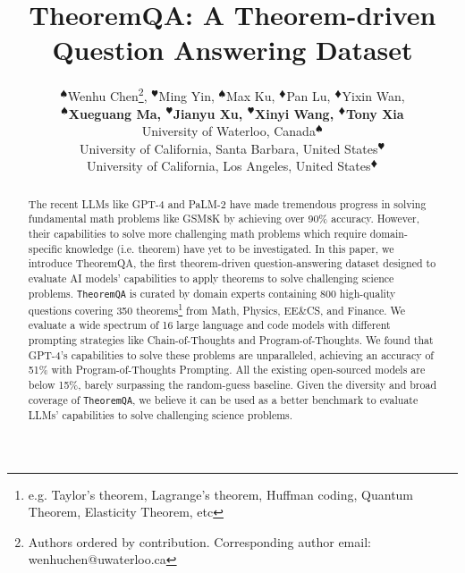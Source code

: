 \documentclass[11pt]{article}
\title{TheoremQA: A Theorem-driven Question Answering Dataset}
\author{$^{\spadesuit}$Wenhu Chen\thanks{\quad Authors ordered by contribution. Corresponding author email: wenhuchen@uwaterloo.ca}, $^{\varheartsuit}$Ming Yin, $^{\spadesuit}$Max Ku, $^{\vardiamondsuit}$Pan Lu, $^{\vardiamondsuit}$Yixin Wan, \\
\textbf{$^{\spadesuit}$Xueguang Ma, $^{\varheartsuit}$Jianyu Xu, $^{\varheartsuit}$Xinyi Wang, $^{\vardiamondsuit}$Tony Xia}\\
University of Waterloo, Canada$^{\spadesuit}$ \\
University of California, Santa Barbara, United States$^{\varheartsuit}$ \\
University of California, Los Angeles, United States$^{\vardiamondsuit}$ \\}
\newcommand{\dataset}{\texttt{TheoremQA}\xspace}
\begin{document}
\maketitle
\begin{abstract}
The recent LLMs like GPT-4 and PaLM-2 have made tremendous progress in solving fundamental math problems like GSM8K by achieving over 90\% accuracy. However, their capabilities to solve more challenging math problems which require domain-specific knowledge (i.e. theorem) have yet to be investigated. In this paper, we introduce TheoremQA, the first theorem-driven question-answering dataset designed to evaluate AI models' capabilities to apply theorems to solve challenging science problems. \dataset is curated by domain experts containing 800 high-quality questions covering 350 theorems\footnote{e.g. Taylor's theorem, Lagrange's theorem, Huffman coding, Quantum Theorem, Elasticity Theorem, etc} from Math, Physics, EE\&CS, and Finance. We evaluate a wide spectrum of 16 large language and code models with different prompting strategies like Chain-of-Thoughts and Program-of-Thoughts. We found that GPT-4's capabilities to solve these problems are unparalleled, achieving an accuracy of 51\% with Program-of-Thoughts Prompting. All the existing open-sourced models are below 15\%, barely surpassing the random-guess baseline. Given the diversity and broad coverage of \dataset, we believe it can be used as a better benchmark to evaluate LLMs' capabilities to solve challenging science problems. 
\end{abstract}
\end{document}
